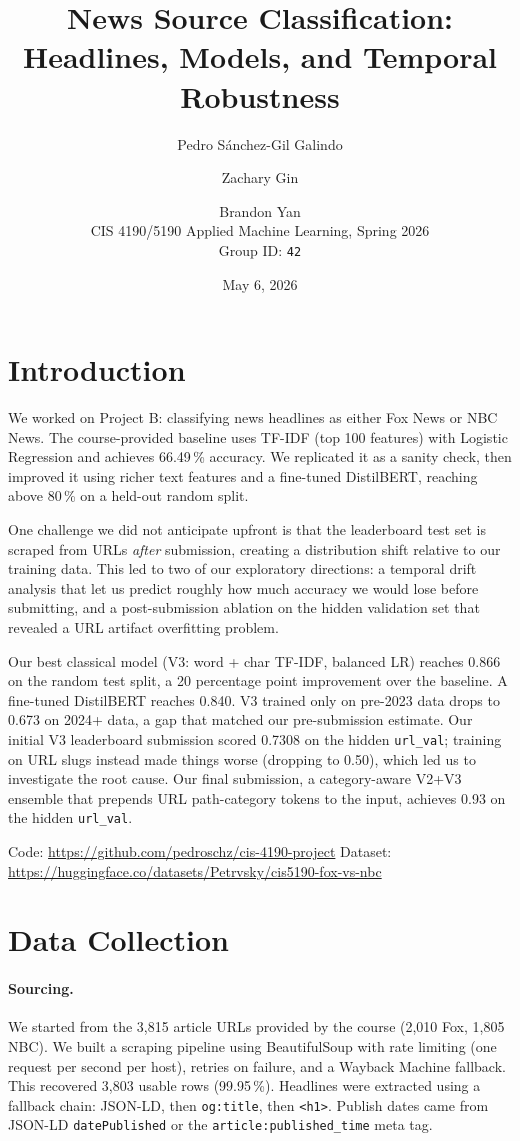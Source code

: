 \documentclass[11pt]{article}
\title{News Source Classification: Headlines, Models, and Temporal Robustness}
\author{Pedro Sánchez-Gil Galindo \and Zachary Gin \and Brandon Yan \\[4pt] \normalsize CIS 4190/5190 Applied Machine Learning, Spring 2026 \\ \normalsize Group ID: \texttt{42}}
\date{May 6, 2026}
\begin{document}
\maketitle

\section{Introduction}
We worked on Project B: classifying news headlines as either Fox News or NBC News. The course-provided baseline uses TF-IDF (top 100 features) with Logistic Regression and achieves 66.49\,\% accuracy. We replicated it as a sanity check, then improved it using richer text features and a fine-tuned DistilBERT, reaching above 80\,\% on a held-out random split.

One challenge we did not anticipate upfront is that the leaderboard test set is scraped from URLs \emph{after} submission, creating a distribution shift relative to our training data. This led to two of our exploratory directions: a temporal drift analysis that let us predict roughly how much accuracy we would lose before submitting, and a post-submission ablation on the hidden validation set that revealed a URL artifact overfitting problem.

Our best classical model (V3: word + char TF-IDF, balanced LR) reaches 0.866 on the random test split, a 20 percentage point improvement over the baseline. A fine-tuned DistilBERT reaches 0.840. V3 trained only on pre-2023 data drops to 0.673 on 2024+ data, a gap that matched our pre-submission estimate. Our initial V3 leaderboard submission scored 0.7308 on the hidden \texttt{url\_val}; training on URL slugs instead made things worse (dropping to 0.50), which led us to investigate the root cause. Our final submission, a category-aware V2+V3 ensemble that prepends URL path-category tokens to the input, achieves 0.93 on the hidden \texttt{url\_val}.

Code: \url{https://github.com/pedroschz/cis-4190-project} \quad Dataset: \url{https://huggingface.co/datasets/Petrvsky/cis5190-fox-vs-nbc}

\section{Data Collection}
\paragraph{Sourcing.}
We started from the 3,815 article URLs provided by the course (2,010 Fox, 1,805 NBC). We built a scraping pipeline using BeautifulSoup with rate limiting (one request per second per host), retries on failure, and a Wayback Machine fallback. This recovered 3,803 usable rows (99.95\,\%). Headlines were extracted using a fallback chain: JSON-LD, then \texttt{og:title}, then \texttt{<h1>}. Publish dates came from JSON-LD \texttt{datePublished} or the \texttt{article:published\_time} meta tag.
\end{document}
